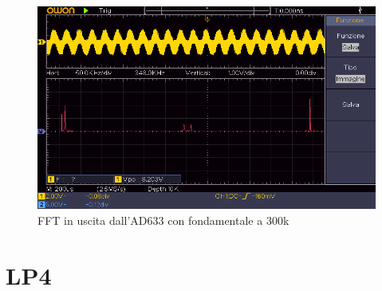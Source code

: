 \documentclass[titlepage]{report}
\begin{document}
	\begin{figure}[h]
		\centering
		\includegraphics[scale=0.9]{Immagini/AD633_300k.png}
		\caption{FFT in uscita dall'AD633 con fondamentale a 300k}
		\label{fig:FFTAD633}
	\end{figure}

	\label{ch:Risultati}
	

\newpage
\section{LP4}
	
\end{document}
